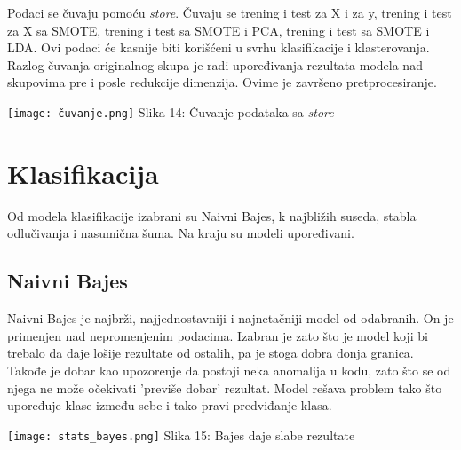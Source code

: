 \documentclass[a4paper]{article}
\begin{document}
{\noindent\begin{minipage}{0.4\textwidth}
Podaci se čuvaju pomoću {\em store}. Čuvaju se trening i test za X i za y, trening i test za X sa SMOTE,
trening i test sa SMOTE i PCA, trening i test sa SMOTE i LDA. Ovi podaci će kasnije biti korišćeni u svrhu klasifikacije i klasterovanja. Razlog čuvanja originalnog skupa je radi upoređivanja rezultata modela nad skupovima pre i posle redukcije dimenzija. Ovime je završeno pretprocesiranje.
\end{minipage}
\noindent\begin{minipage}{0.1\textwidth}
\hphantom{a}
\end{minipage}
\noindent\begin{minipage}{0.4\textwidth}
\texttt{[image: čuvanje.png]}
\hphantom{a}Slika 14: Čuvanje podataka sa {\em store}\\
\end{minipage}

\section{Klasifikacija}
\label{klasifikacija}

Od modela klasifikacije izabrani su Naivni Bajes, k najbližih suseda, stabla odlučivanja i nasumična šuma. Na kraju su modeli upoređivani.

\subsection{Naivni Bajes}
\label{bajes}

\noindent\begin{minipage}{0.3\textwidth}
Naivni Bajes je najbrži, najjednostavniji i najnetačniji model od odabranih. On je primenjen nad nepromenjenim podacima. Izabran je zato što je model koji bi trebalo da daje lošije rezultate od ostalih, pa je stoga dobra donja granica. Takođe je dobar kao upozorenje da postoji neka anomalija u kodu, zato što se od njega ne može očekivati 'previše dobar' rezultat. Model rešava problem tako što upoređuje klase između sebe i tako pravi predviđanje klasa.
\end{minipage}
\noindent\begin{minipage}{0.05\textwidth}
\hphantom{a}
\end{minipage}
\noindent\begin{minipage}{0.55\textwidth}
\texttt{[image: stats\_bayes.png]}
Slika 15: Bajes daje slabe rezultate\\
\end{minipage}

}
\end{document}
